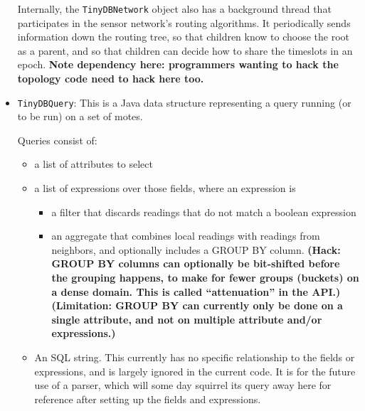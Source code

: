\documentclass[11pt]{article}
\begin{document}
\begin{itemize}
  Internally, the {\tt TinyDBNetwork} object also has a background thread
  that participates in the sensor network's routing algorithms.  It
  periodically sends information down the routing tree, so that
  children know to choose the root as a parent, and so that children
  can decide how to share the timeslots in an epoch.  {\bf Note
  dependency here: programmers wanting to hack the topology code need
  to hack here too.}

\item {\tt TinyDBQuery}: This is a Java data structure representing a
    query running (or to be run) on a set of motes.
    
    Queries consist of:
    \begin{itemize}
    \item a list of attributes to select
    \item a list of expressions over those fields, where an expression
    is
      \begin{itemize}
      \item a filter that discards readings that do not match a
      boolean expression
      \item an aggregate that combines local readings with readings from
        neighbors, and optionally includes a GROUP BY column.  {\bf
        (Hack: GROUP BY columns can optionally be bit-shifted before
        the grouping happens, to make for fewer groups (buckets) on a
        dense domain.  This is called ``attenuation'' in the API.)}
        {\bf (Limitation: GROUP BY can currently only be done on a
        single attribute, and not on multiple
        attribute and/or expressions.)} 
      \end{itemize}
    \item An SQL string.  This currently has no specific relationship
    to the fields or expressions, and is largely ignored in the
    current code.  It is for the future use of a parser, which will
    some day squirrel its query away here for reference after setting
    up the fields and expressions.
    \end{itemize}


\end{itemize}
\end{document}
